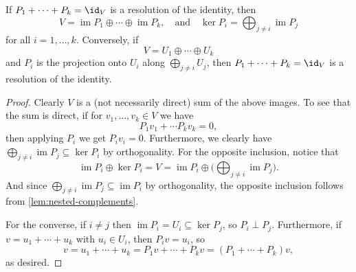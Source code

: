 \documentclass[a4paper, 11pt]{memoir}
\numberwithin{equation}{chapter}
\newcommand{\im}{\operatorname{im}}
\begin{document}
\begin{proposition}
    \label{prop:resolution-of-the-identity-characterisation}
    If $P_1 + \cdots + P_k = \id_V$ is a resolution of the identity, then
    \begin{equation*}
        V
            = \im P_1 \oplus \cdots \oplus \im P_k,
        \quad \text{and} \quad
        \ker P_i
            = \bigoplus_{j \neq i} \im P_j
    \end{equation*}
    for all $i = 1, \ldots, k$. Conversely, if
    \begin{equation*}
        V
            = U_1 \oplus \cdots \oplus U_k
    \end{equation*}
    and $P_i$ is the projection onto $U_i$ along $\bigoplus_{j \neq i} U_j$, then $P_1 + \cdots + P_k = \id_V$ is a resolution of the identity.
\end{proposition}

\begin{proof}
    Clearly $V$ is a (not necessarily direct) sum of the above images. To see that the sum is direct, if for $v_1, \ldots, v_k \in V$ we have
    \begin{equation*}
        P_1 v_1 + \cdots P_k v_k = 0,
    \end{equation*}
    then applying $P_i$ we get $P_i v_i = 0$. Furthermore, we clearly have $\bigoplus_{j \neq i} \im P_j \subseteq \ker P_i$ by orthogonality. For the opposite inclusion, notice that
    \begin{equation*}
        \im P_i \oplus \ker P_i
            = V
            = \im P_i \oplus \biggl( \bigoplus_{j \neq i} \im P_j \biggr).
    \end{equation*}
    And since $\bigoplus_{j \neq i} \im P_j \subseteq \im P_i$ by orthogonality, the opposite inclusion follows from \cref{lem:nested-complements}.

    For the converse, if $i \neq j$ then $\im P_i = U_i \subseteq \ker P_j$, so $P_i \perp P_j$. Furthermore, if $v = u_1 + \cdots + u_k$ with $u_i \in U_i$, then $P_i v = u_i$, so
    \begin{equation*}
        v
            = u_1 + \cdots + u_k
            = P_1 v + \cdots + P_k v
            = (P_1 + \cdots + P_k) v,
    \end{equation*}
    as desired.
\end{proof}




\nocite{*}
\chapter*{\bibname}
\markboth{\bibname}{\bibname}
\printbibliography[heading=none]
\end{document}

